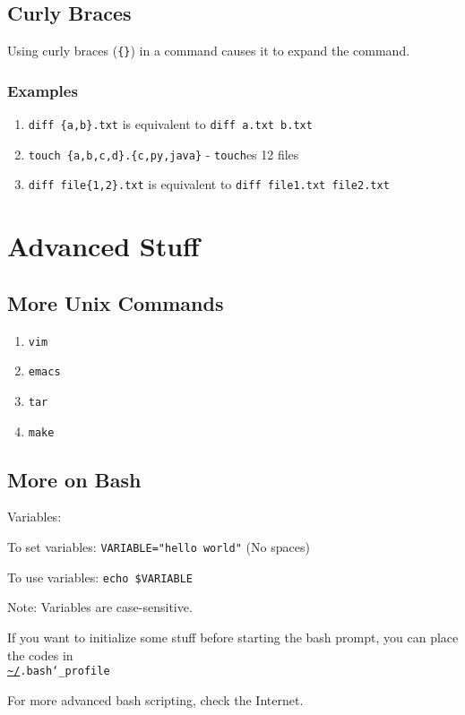 \documentclass[12pt]{article}
\newcommand{\urlwofont}[1]{\urlstyle{same}\url{#1}}
\begin{document}
\subsection{Curly Braces}
Using curly braces (\texttt{\{\}}) in a command causes it to expand the command.

\subsubsection{Examples}
\begin{enumerate}
\item \texttt{diff \{a,b\}.txt} is equivalent to \texttt{diff a.txt b.txt}
\item \texttt{touch \{a,b,c,d\}.\{c,py,java\}} - \texttt{touch}es 12 files
\item \texttt{diff file\{1,2\}.txt} is equivalent to \texttt{diff file1.txt file2.txt}
\end{enumerate}

\newpage
\section{Advanced Stuff}
\subsection{More Unix Commands}
\begin{enumerate}

\item{\texttt{vim}}

\item{\texttt{emacs}}

\item{\texttt{tar}}

\item{\texttt{make}}
\end{enumerate}

\subsection{More on Bash}
Variables:

To set variables:
\texttt{VARIABLE="hello world"} (No spaces)

To use variables:
\texttt{echo \$VARIABLE}

Note: Variables are case-sensitive.

If you want to initialize some stuff before starting the bash prompt, you can place the codes in \\ \texttt{\urlwofont{~/}.bash\char`_profile}



For more advanced bash scripting, check the Internet.
\end{document}

